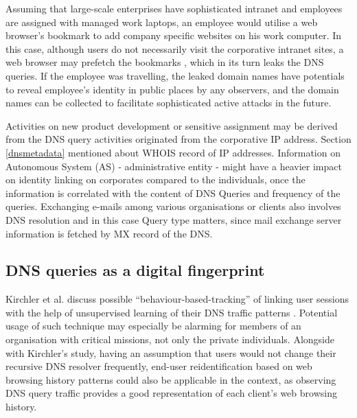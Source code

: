 Assuming that large-scale enterprises have sophisticated intranet and employees are assigned with managed work laptops, an employee would utilise a web browser's bookmark to add company specific websites on his work computer. In this case, although users do not necessarily visit the corporative intranet sites, a web browser may prefetch the bookmarks \cite{firefox-autocomplete-url, chrome-dns-prefectching}, which in its turn leaks the DNS queries. If the employee was travelling, the leaked domain names have potentials to reveal employee's identity in public places by any observers, and the domain names can be collected to facilitate sophisticated active attacks in the future.

Activities on new product development or sensitive assignment may be derived from the DNS query activities originated from the corporative IP address. Section \ref{dnsmetadata} mentioned about WHOIS record of IP addresses. Information on Autonomous System (AS) - administrative entity - might have a heavier impact on identity linking on corporates compared to the individuals, once the information is correlated with the content of DNS Queries and frequency of the queries. Exchanging e-mails among various organisations or clients also involves DNS resolution and in this case Query type matters, since mail exchange server information is fetched by MX record of the DNS.

\subsection{DNS queries as a digital fingerprint}
Kirchler et al. discuss possible ``behaviour-based-tracking'' of linking user sessions with the help of unsupervised learning of their DNS traffic patterns \cite{kirchler2016tracked}. Potential usage of such technique may especially be alarming for members of an organisation with critical missions, not only the private individuals.
Alongside with Kirchler's study, having an assumption that users would not change their recursive DNS resolver frequently, end-user reidentification based on web browsing history patterns \cite{olejnik2012johnny} could also be applicable in the context, as observing DNS query traffic provides a good representation of each client's web browsing history.